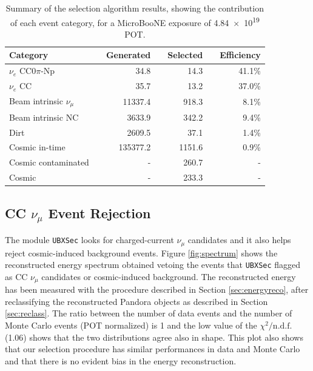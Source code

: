 \begin{table}[htbp]
   \centering
   \begin{tabular}{llrrrrr}
     \toprule
     Category & \phantom{a} & Generated & \phantom{a} & Selected & \phantom{a} & Efficiency \\
     \midrule

     $\nu_{e}$ CC0$\pi$-Np       & & 34.8     & & 14.3   & & 41.1\%\\
     $\nu_{e}$ CC                & & 35.7     & & 13.2   & & 37.0\%\\
     Beam intrinsic $\nu_{\mu}$  & & 11337.4  & & 918.3  & & 8.1\%\\
     Beam intrinsic NC           & & 3633.9   & & 342.2  & & 9.4\%\\
     Dirt                        & & 2609.5   & & 37.1   & & 1.4\%\\
     Cosmic in-time              & & 135377.2 & & 1151.6 & & 0.9\%\\
     Cosmic contaminated         & & -        & & 260.7  & & -\\
     Cosmic                      & & -        & & 233.3  & & -\\

     \bottomrule
   \end{tabular}
   \caption{Summary of the selection algorithm results, showing the contribution of each event category, for a MicroBooNE exposure of \num{4.84e19} POT.}\label{tab:result}
\end{table}


\subsection{CC \texorpdfstring{$\nu_{\mu}$}{numu} Event Rejection}\label{sec:numu}
The module \texttt{UBXSec} \cite{ubxsec} looks for charged-current $\nu_{\mu}$ candidates and it also helps reject cosmic-induced background events.  Figure \ref{fig:spectrum} shows the reconstructed energy spectrum obtained vetoing the events that \texttt{UBXSec} flagged as CC $\nu_{\mu}$ candidates or cosmic-induced background. The reconstructed energy has been measured with the procedure described in Section \ref{sec:energyreco}, after reclassifying the reconstructed Pandora objects as described in Section \ref{sec:reclass}. The ratio between the number of data events and the number of Monte Carlo events (POT normalized) is 1 and the low value of the $\chi^{2} / \mathrm{n.d.f.}$ (1.06) shows that the two distributions agree also in shape. This plot also shows that our selection procedure has similar performances in data and Monte Carlo and that there is no evident bias in the energy reconstruction.


